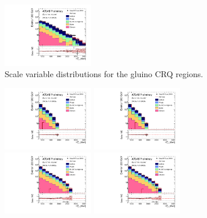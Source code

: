 \begin{figure}[tbph]
\begin{center}
\includegraphics[width=0.35\textwidth]{figures/ATLAS-CONF-2016-078_INT/N-1Plots/AtlasStyle/Preliminary/CRQ_SRJigsawSRG3b_LastCut_CRQ_minusone}
\end{center}
\caption{Scale variable distributions for the gluino CRQ regions.}
\label{fig:CRQ_SRJigsawSRG1b_LastCut_CRQ_minusone}
\end{figure}

\begin{figure}[tbph]
\begin{center}
\includegraphics[width=0.35\textwidth]{figures/ATLAS-CONF-2016-078_INT/N-1Plots/AtlasStyle/Preliminary/CRQ_SRJigsawSRS1a_LastCut_CRQ_minusone}
\includegraphics[width=0.35\textwidth]{figures/ATLAS-CONF-2016-078_INT/N-1Plots/AtlasStyle/Preliminary/CRQ_SRJigsawSRS1b_LastCut_CRQ_minusone}
\includegraphics[width=0.35\textwidth]{figures/ATLAS-CONF-2016-078_INT/N-1Plots/AtlasStyle/Preliminary/CRQ_SRJigsawSRS2a_LastCut_CRQ_minusone}
\includegraphics[width=0.35\textwidth]{figures/ATLAS-CONF-2016-078_INT/N-1Plots/AtlasStyle/Preliminary/CRQ_SRJigsawSRS2b_LastCut_CRQ_minusone}

\end{center}
\end{figure}

